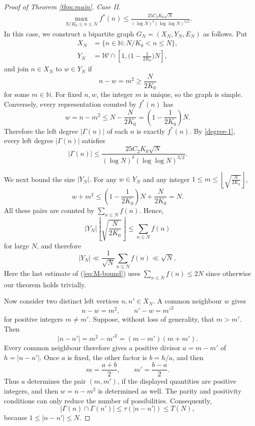 \documentclass[12pt,a4paper,reqno]{amsart}
\numberwithin{equation}{section}
\def\N{{\mathbb N}}
\theoremstyle{plain}
\theoremstyle{definition}
\begin{document}
\begin{proof}[Proof of Theorem \ref{thm:main}]
{\it Case II.} 
\begin{align}\label{degree-1}
\max_{N/K_0\le n\le N}f^*(n)\le \frac{25C_2K_0\sqrt{N}}{(\log N)^{\delta}(\log\log N)^{3/2}}.
\end{align}
In this case, we construct a bipartite graph \(G_N=(X_N,Y_N,E_N)\) as follows. Put
\begin{align*}
 X_N&=\big\{n\in\N:N/K_0<n\le N\big\},\\
 Y_N&=\mathcal{W}\cap\left[1,\Big(1-\frac{1}{2K_0}\Big)N\right],
\end{align*}
and join \(n\in X_N\) to \(w\in Y_N\) if
\[
 n-w=m^2\ge\frac{N}{2K_0}
\]
for some \(m\in\N\).  For fixed \(n,w\), the integer \(m\) is unique, so the graph is simple.  Conversely, every representation counted by \(f^*(n)\) has
\[
 w=n-m^2\le N-\frac{N}{2K_0}=\left(1-\frac{1}{2K_0}\right)N.
\]
Therefore the left degree $|\Gamma(n)|$ of each $n$ is exactly $f^*(n)$.
By \eqref{degree-1}, every left degree $|\Gamma(n)|$ satisfies
\begin{equation}\label{eq:graph-B}
 |\Gamma(n)|\le\frac{25C_2K_0\sqrt{N}}{(\log N)^{\delta}(\log\log N)^{3/2}}.
\end{equation}

We next bound the size
\(
 |Y_N|.
\)
For any \(w\in Y_N\) and any integer \(1\le m\le\left\lfloor\sqrt{\frac{N}{2K_0}}\right\rfloor\),
\[
 w+m^2\le\left(1-\frac{1}{2K_0}\right)N+\frac{N}{2K_0}=N.
\]
All these pairs are counted by \(\sum_{n\le N}f(n)\).  Hence,
\[
 |Y_N|\left\lfloor\sqrt{\frac{N}{2K_0}}\right\rfloor
 \le \sum_{n\le N}f(n)
\]
for large \(N\), and therefore
\begin{equation}\label{eq:M-bound}
 |Y_N|\ll \frac{1}{\sqrt{N}}\sum_{n\le N}f(n)\ll \sqrt{N},
\end{equation}
Here the last estimate of (\ref{eq:M-bound}) uses $\sum_{n\le N}f(n)\le 2N$ since otherwise our theorem holds trivially.


Now consider two distinct left vertices \(n,n'\in X_N\).  A common neighbour \(w\) gives
\[
 n-w=m^2,
 \qquad
 n'-w={m'}^2
\]
for positive integers \(m\ne m'\).  Suppose, without loss of generality, that \(m>m'\).  Then
\begin{equation}\label{eq:difference-squares}
 |n-n'|=m^2-{m'}^2=(m-m')(m+m').
\end{equation}
Every common neighbour therefore gives a positive divisor
\(
 a=m-m'
\)
of \(h=|n-n'|\).  Once \(a\) is fixed, the other factor is \(b=h/a\), and then
\[
 m=\frac{a+b}{2},
 \qquad
 m'=\frac{b-a}{2}.
\]
Thus \(a\) determines the pair \((m,m')\), if the displayed quantities are positive integers, and then \(w=n-m^2\) is determined as well.  The parity and positivity conditions can only reduce the number of possibilities.  Consequently,
\begin{equation}\label{eq:codegree}
 |\Gamma(n)\cap\Gamma(n')|
 \le\tau(|n-n'|)
 \le T(N),
\end{equation}
because \(1\le|n-n'|\le N\).


\end{proof}
\end{document}
